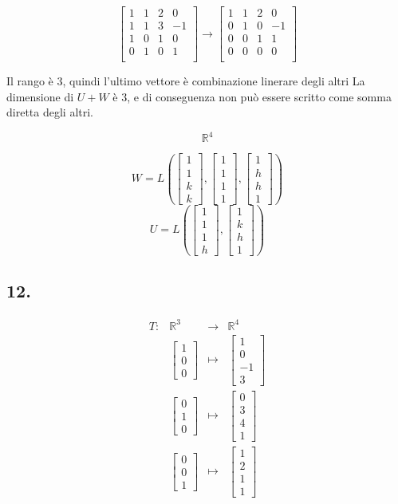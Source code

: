\documentclass{article}
\newcommand*{\m}[1]{\begin{bmatrix}#1\end{bmatrix}}
\begin{document}
\[
    \m{
        1&1&2&0\\
        1&1&3&-1\\
        1&0&1&0\\
        0&1&0&1\\
    }\longrightarrow\m{
        1&1&2&0\\
        0&1&0&-1\\
        0&0&1&1\\
        0&0&0&0\\
    }
\]

Il rango è $3$, quindi l'ultimo vettore è combinazione linerare degli altri
La dimensione di $U+W$ è $3$, e di conseguenza non può essere scritto come
somma diretta degli altri.

\[\mathbb{R}^4\]

\[W = L\left(\m{1\\1\\k\\k},\m{1\\1\\1\\1},\m{1\\h\\h\\1}\right)\]
\[U = L\left(\m{1\\1\\1\\h},\m{1\\k\\h\\1}\right)\]

\subsection*{12.}

\[\begin{aligned}
    T:&\mathbb{R}^3&\longrightarrow&\mathbb{R}^4\\
      &\m{1\\0\\0}&\longmapsto&\m{1\\0\\-1\\3}\\
      &\m{0\\1\\0}&\longmapsto&\m{0\\3\\4\\1}\\
      &\m{0\\0\\1}&\longmapsto&\m{1\\2\\1\\1}\\
\end{aligned}\]
\end{document}
